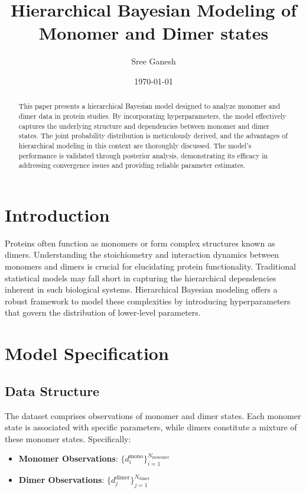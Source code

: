 \documentclass[12pt]{article}
\title{Hierarchical Bayesian Modeling of Monomer and Dimer states}
\author{Sree Ganesh}
\date{\today}
\begin{document}
\maketitle

\begin{abstract}
This paper presents a hierarchical Bayesian model designed to analyze monomer and dimer data in protein studies. By incorporating hyperparameters, the model effectively captures the underlying structure and dependencies between monomer and dimer states. The joint probability distribution is meticulously derived, and the advantages of hierarchical modeling in this context are thoroughly discussed. The model's performance is validated through posterior analysis, demonstrating its efficacy in addressing convergence issues and providing reliable parameter estimates.
\end{abstract}

\section{Introduction}
Proteins often function as monomers or form complex structures known as dimers. Understanding the stoichiometry and interaction dynamics between monomers and dimers is crucial for elucidating protein functionality. Traditional statistical models may fall short in capturing the hierarchical dependencies inherent in such biological systems. Hierarchical Bayesian modeling offers a robust framework to model these complexities by introducing hyperparameters that govern the distribution of lower-level parameters.

\section{Model Specification}

\subsection{Data Structure}
The dataset comprises observations of monomer and dimer states. Each monomer state is associated with specific parameters, while dimers constitute a mixture of these monomer states. Specifically:

\begin{itemize}
    \item \textbf{Monomer Observations}: \( \{d_i^{\text{mono}}\}_{i=1}^{N_{\text{monomer}}} \)
    \item \textbf{Dimer Observations}: \( \{d_j^{\text{dimer}}\}_{j=1}^{N_{\text{dimer}}} \)
\end{itemize}
\end{document}

